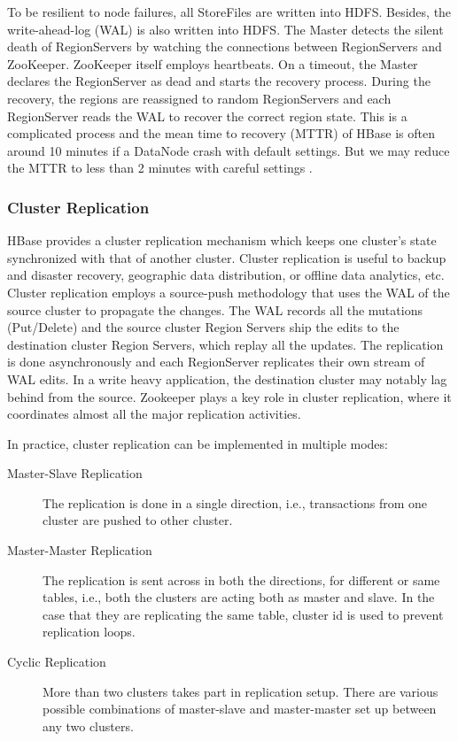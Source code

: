 \documentclass[12pt]{book}
\begin{document}
To be resilient to node failures, all StoreFiles are written into HDFS. Besides, the write-ahead-log (WAL) is also written into HDFS. The Master detects the silent death of RegionServers by watching the connections between RegionServers and ZooKeeper. ZooKeeper itself employs heartbeats. On a timeout, the Master declares the RegionServer as dead and starts the recovery process. During the recovery, the regions are reassigned to random RegionServers and each RegionServer reads the WAL to recover the correct region state. This is a complicated process and the mean time to recovery (MTTR) of HBase is often around 10 minutes if a DataNode crash with default settings. But we may reduce the MTTR to less than 2 minutes with careful settings \cite{HBaseMTTR}.

\subsubsection{Cluster Replication}

HBase provides a cluster replication mechanism which keeps one cluster's state synchronized with that of another cluster. Cluster replication is useful to backup and disaster recovery, geographic data distribution, or offline data analytics, etc. Cluster replication employs a source-push methodology that uses the WAL of the source cluster to propagate the changes. The WAL records all the mutations (Put/Delete) and the source cluster Region Servers ship the edits to the destination cluster Region Servers, which replay all the updates. The replication is done asynchronously and each RegionServer replicates their own stream of WAL edits. In a write heavy application, the destination cluster may notably lag behind from the source. Zookeeper plays a key role in cluster replication, where it coordinates almost all the major replication activities.

In practice, cluster replication can be implemented in multiple modes:
\begin{description}
\item[Master-Slave Replication]
The replication is done in a single direction, i.e., transactions from one cluster are pushed to other cluster.
\item[Master-Master Replication]
The replication is sent across in both the directions, for different or same tables, i.e., both the clusters are acting both as master and slave. In the case that they are replicating the same table, cluster id is used to prevent replication loops.
\item[Cyclic Replication]
More than two clusters takes part in replication setup. There are various possible combinations of master-slave and master-master set up between any two clusters. 
\end{description}
\end{document}
